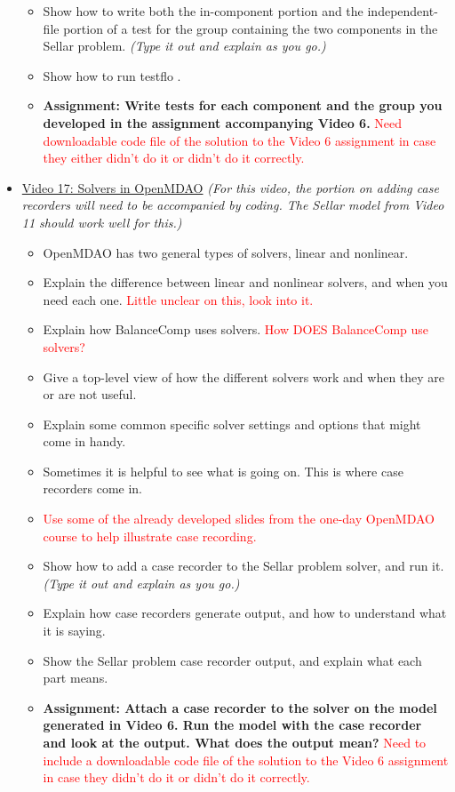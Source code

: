 \documentclass[12pt, letterpaper]{article}
\begin{document}
\begin{itemize}
\begin{itemize}
			\item Show how to write both the in-component portion and the independent-file portion of a test for the group containing the two components in the Sellar problem. \textit{(Type it out and explain as you go.)}
			\item Show how to run testflo .
			\item \textbf{Assignment: Write tests for each component and the group you developed in the assignment accompanying Video 6.} \textcolor{red}{Need downloadable code file of the solution to the Video 6 assignment in case they either didn't do it or didn't do it correctly.}
		\end{itemize}
	
	\item \underline{Video 17: Solvers in OpenMDAO} \textit{(For this video, the portion on adding case recorders will need to be accompanied by coding. The Sellar model from Video 11 should work well for this.)}
		\begin{itemize}
			\item OpenMDAO has two general types of solvers, linear and nonlinear.
			\item Explain the difference between linear and nonlinear solvers, and when you need each one. \textcolor{red}{Little unclear on this, look into it.}
			\item Explain how BalanceComp uses solvers. \textcolor{red}{How DOES BalanceComp use solvers?}
			\item Give a top-level view of how the different solvers work and when they are or are not useful.
			\item Explain some common specific solver settings and options that might come in handy.
			\item Sometimes it is helpful to see what is going on. This is where case recorders come in.
			\item \textcolor{red}{Use some of the already developed slides from the one-day OpenMDAO course to help illustrate case recording.}
			\item Show how to add a case recorder to the Sellar problem solver, and run it. \textit{(Type it out and explain as you go.)}
			\item Explain how case recorders generate output, and how to understand what it is saying.
			\item Show the Sellar problem case recorder output, and explain what each part means.
			\item \textbf{Assignment: Attach a case recorder to the solver on the model generated in Video 6. Run the model with the case recorder and look at the output. What does the output mean?} \textcolor{red}{Need to include a downloadable code file of the solution to the Video 6 assignment in case they didn't do it or didn't do it correctly.}
		\end{itemize}
		

\end{itemize}
\end{document}
